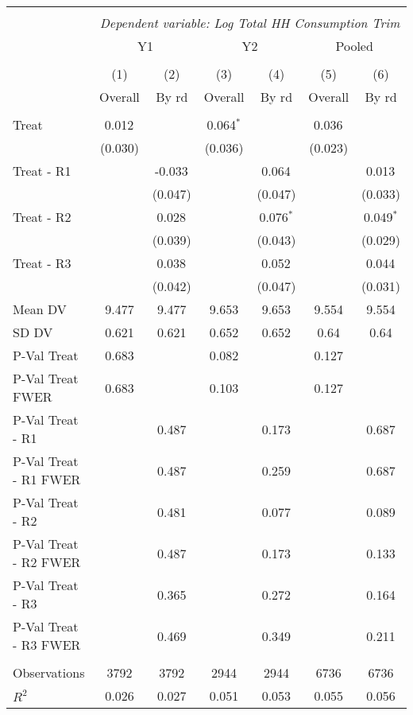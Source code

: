 \begin{tabular}{@{\extracolsep{5pt}}lcccccc}
\\[-1.8ex]\hline
\hline \\[-1.8ex]
& \multicolumn{6}{c}{\textit{Dependent variable: Log Total HH Consumption Trim}} \
\cr \cline{2-7}
\\[-1.8ex] & \multicolumn{2}{c}{Y1} & \multicolumn{2}{c}{Y2} & \multicolumn{2}{c}{Pooled}  \\
\\[-1.8ex] & (1) & (2) & (3) & (4) & (5) & (6) 
 \\ & Overall & By rd & Overall & By rd & Overall & By rd \\
\hline \\[-1.8ex]
 Treat & 0.012$^{}$ & & 0.064$^{*}$ & & 0.036$^{}$ & \\
& (0.030) & & (0.036) & & (0.023) & \\
 Treat - R1 & & -0.033$^{}$ & & 0.064$^{}$ & & 0.013$^{}$ \\
& & (0.047) & & (0.047) & & (0.033) \\
 Treat - R2 & & 0.028$^{}$ & & 0.076$^{*}$ & & 0.049$^{*}$ \\
& & (0.039) & & (0.043) & & (0.029) \\
 Treat - R3 & & 0.038$^{}$ & & 0.052$^{}$ & & 0.044$^{}$ \\
& & (0.042) & & (0.047) & & (0.031) \\
 Mean DV & 9.477 & 9.477 & 9.653 & 9.653 & 9.554 & 9.554 \\
 SD DV & 0.621 & 0.621 & 0.652 & 0.652 & 0.64 & 0.64 \\
 P-Val Treat & 0.683 &  & 0.082 &  & 0.127 &  \\
 P-Val Treat FWER & 0.683 &  & 0.103 &  & 0.127 &  \\
 P-Val Treat - R1 &  & 0.487 &  & 0.173 &  & 0.687 \\
 P-Val Treat - R1 FWER &  & 0.487 &  & 0.259 &  & 0.687 \\
 P-Val Treat - R2 &  & 0.481 &  & 0.077 &  & 0.089 \\
 P-Val Treat - R2 FWER &  & 0.487 &  & 0.173 &  & 0.133 \\
 P-Val Treat - R3 &  & 0.365 &  & 0.272 &  & 0.164 \\
 P-Val Treat - R3 FWER &  & 0.469 &  & 0.349 &  & 0.211 \\
\hline \\[-1.8ex]
 Observations & 3792 & 3792 & 2944 & 2944 & 6736 & 6736 \\
 $R^2$ & 0.026 & 0.027 & 0.051 & 0.053 & 0.055 & 0.056 \\

\end{tabular}
